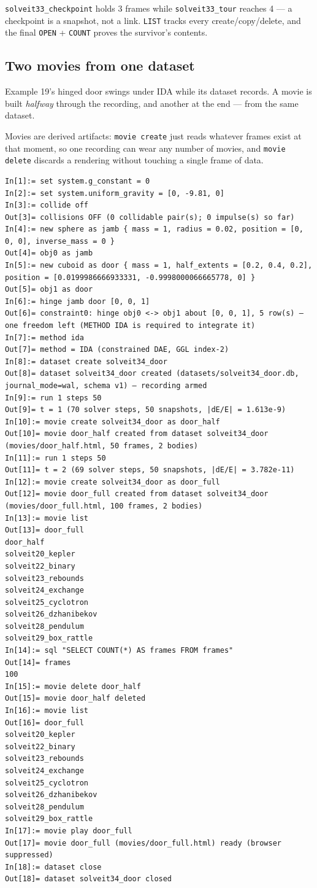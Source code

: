 \documentclass[11pt]{article}
\newcommand{\kw}[1]{\texttt{\uppercase{#1}}}
\newcommand{\code}[1]{\texttt{#1}}
\begin{document}
\code{solveit33\_checkpoint} holds 3 frames while
\code{solveit33\_tour} reaches 4 --- a checkpoint is a snapshot, not a
link. \kw{list} tracks every create/copy/delete, and the final
\kw{open} + \code{COUNT} proves the survivor's contents.

\subsection{Two movies from one dataset}

Example 19's hinged door swings under IDA while its dataset records.
A movie is built \emph{halfway} through the recording, and another at
the end --- from the same dataset.

Movies are derived artifacts: \code{movie create} just reads whatever
frames exist at that moment, so one recording can wear any number of
movies, and \code{movie delete} discards a rendering without touching
a single frame of data.

\begin{lstlisting}
In[1]:= set system.g_constant = 0
In[2]:= set system.uniform_gravity = [0, -9.81, 0]
In[3]:= collide off
Out[3]= collisions OFF (0 collidable pair(s); 0 impulse(s) so far)
In[4]:= new sphere as jamb { mass = 1, radius = 0.02, position = [0, 0, 0], inverse_mass = 0 }
Out[4]= obj0 as jamb
In[5]:= new cuboid as door { mass = 1, half_extents = [0.2, 0.4, 0.2], position = [0.0199986666933331, -0.9998000066665778, 0] }
Out[5]= obj1 as door
In[6]:= hinge jamb door [0, 0, 1]
Out[6]= constraint0: hinge obj0 <-> obj1 about [0, 0, 1], 5 row(s) — one freedom left (METHOD IDA is required to integrate it)
In[7]:= method ida
Out[7]= method = IDA (constrained DAE, GGL index-2)
In[8]:= dataset create solveit34_door
Out[8]= dataset solveit34_door created (datasets/solveit34_door.db, journal_mode=wal, schema v1) — recording armed
In[9]:= run 1 steps 50
Out[9]= t = 1 (70 solver steps, 50 snapshots, |dE/E| = 1.613e-9)
In[10]:= movie create solveit34_door as door_half
Out[10]= movie door_half created from dataset solveit34_door (movies/door_half.html, 50 frames, 2 bodies)
In[11]:= run 1 steps 50
Out[11]= t = 2 (69 solver steps, 50 snapshots, |dE/E| = 3.782e-11)
In[12]:= movie create solveit34_door as door_full
Out[12]= movie door_full created from dataset solveit34_door (movies/door_full.html, 100 frames, 2 bodies)
In[13]:= movie list
Out[13]= door_full
door_half
solveit20_kepler
solveit22_binary
solveit23_rebounds
solveit24_exchange
solveit25_cyclotron
solveit26_dzhanibekov
solveit28_pendulum
solveit29_box_rattle
In[14]:= sql "SELECT COUNT(*) AS frames FROM frames"
Out[14]= frames
100
In[15]:= movie delete door_half
Out[15]= movie door_half deleted
In[16]:= movie list
Out[16]= door_full
solveit20_kepler
solveit22_binary
solveit23_rebounds
solveit24_exchange
solveit25_cyclotron
solveit26_dzhanibekov
solveit28_pendulum
solveit29_box_rattle
In[17]:= movie play door_full
Out[17]= movie door_full (movies/door_full.html) ready (browser suppressed)
In[18]:= dataset close
Out[18]= dataset solveit34_door closed
\end{lstlisting}
\end{document}

